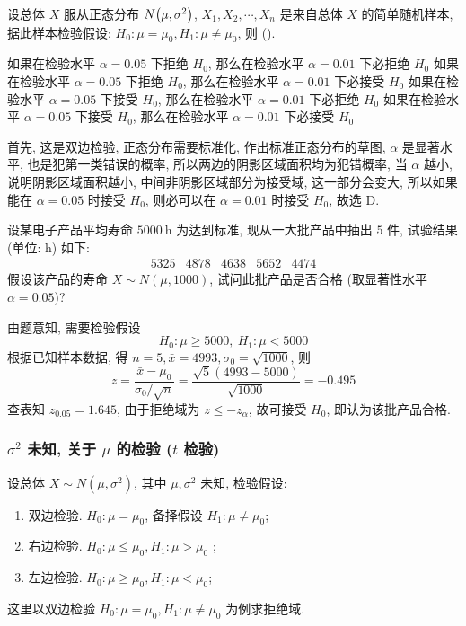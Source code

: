 \begin{example}
    设总体 $X$ 服从正态分布 $N\qty(\mu,\sigma^2)$, $X_1, X_2, \cdots ,X_n$ 是来自总体 $X$ 的简单随机样本, 据此样本检验假设: $H_0:\mu=\mu_0,H_1:\mu\neq \mu_0$, 则 (\quad).
    \begin{tasks}
        \task 如果在检验水平 $\alpha=0.05$ 下拒绝 $H_0$, 那么在检验水平 $\alpha=0.01$ 下必拒绝 $H_0$
        \task 如果在检验水平 $\alpha=0.05$ 下拒绝 $H_0$, 那么在检验水平 $\alpha=0.01$ 下必接受 $H_0$
        \task 如果在检验水平 $\alpha=0.05$ 下接受 $H_0$, 那么在检验水平 $\alpha=0.01$ 下必拒绝 $H_0$
        \task 如果在检验水平 $\alpha=0.05$ 下接受 $H_0$, 那么在检验水平 $\alpha=0.01$ 下必接受 $H_0$
    \end{tasks}
\end{example}
\begin{solution}
    首先, 这是双边检验, 正态分布需要标准化, 作出标准正态分布的草图, $\alpha$ 是显著水平, 也是犯第一类错误的概率, 所以两边的阴影区域面积均为犯错概率,
    当 $\alpha$ 越小, 说明阴影区域面积越小, 中间非阴影区域部分为接受域, 这一部分会变大, 所以如果能在 $\alpha=0.05$ 时接受 $H_0$, 则必可以在 $\alpha=0.01$ 时接受 $H_0$, 故选 D.
\end{solution}

\begin{example}
    设某电子产品平均寿命 $ 5000 \mathrm{~h} $ 为达到标准, 现从一大批产品中抽出 $5$ 件, 试验结果 (单位: h) 如下:
    $$\begin{array}{lllll}
            5325 & 4878 & 4638 & 5652 & 4474
        \end{array}$$
    假设该产品的寿命 $ X \sim N(\mu, 1000)$, 试问此批产品是否合格 (取显著性水平 $ \alpha=0.05$)?
\end{example}
\begin{solution}
    由题意知, 需要检验假设
    $$H_0:\mu\geqslant 5000,~H_1:\mu<5000$$
    根据已知样本数据, 得 $ n=5, \bar{x}=4993, \sigma_{0}=\sqrt{1000} $, 则
    $$z=\frac{\bar{x}-\mu_{0}}{\sigma_{0} / \sqrt{n}}=\frac{\sqrt{5}(4993-5000)}{\sqrt{1000}}=-0.495$$
    查表知 $ z_{0.05}=1.645 $, 由于拒绝域为 $ z \leqslant-z_{\alpha}$, 故可接受 $ H_{0}$, 即认为该批产品合格.
\end{solution}

\subsubsection{\texorpdfstring{$\sigma^2$}. 未知, 关于 \texorpdfstring{$\mu$}. 的检验 (\texorpdfstring{$t$}. 检验)}

设总体 $ X \sim N\left(\mu, \sigma^{2}\right) $, 其中 $ \mu, \sigma^{2} $ 未知, 检验假设:
\begin{enumerate}[label=(\arabic{*})]
    \item 双边检验. $ H_{0}: \mu=\mu_{0} $, 备择假设 $ H_{1}: \mu \neq \mu_{0} $;
    \item 右边检验. $ H_{0}: \mu \leqslant \mu_{0}, H_{1}: \mu>\mu_{0}$ ;
    \item 左边检验. $ H_{0}: \mu \geqslant \mu_{0}, H_{1}: \mu<\mu_{0} $;
\end{enumerate}
这里以双边检验 $ H_{0}: \mu=\mu_{0}, H_{1}: \mu \neq \mu_{0} $ 为例求拒绝域.

